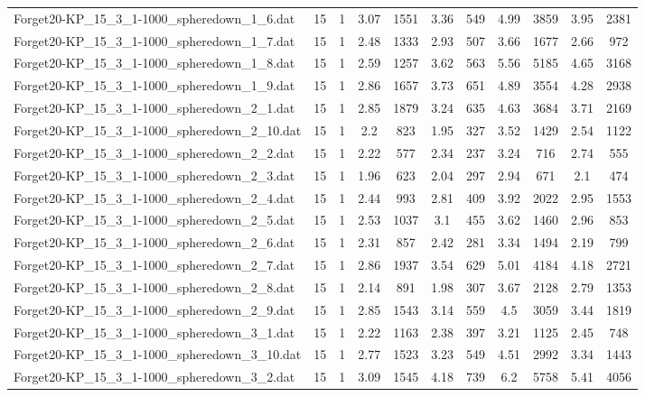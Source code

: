 \begin{table}[!ht]
\begin{tabular}{lcccccccccc}
Forget20-KP\_15\_3\_1-1000\_spheredown\_1\_6.dat & 15 & 1 & 3.07 & 1551 & 3.36 & 549 & 4.99 & 3859 & 3.95 & 2381 \\
Forget20-KP\_15\_3\_1-1000\_spheredown\_1\_7.dat & 15 & 1 & 2.48 & 1333 & 2.93 & 507 & 3.66 & 1677 & 2.66 & 972 \\
Forget20-KP\_15\_3\_1-1000\_spheredown\_1\_8.dat & 15 & 1 & 2.59 & 1257 & 3.62 & 563 & 5.56 & 5185 & 4.65 & 3168 \\
Forget20-KP\_15\_3\_1-1000\_spheredown\_1\_9.dat & 15 & 1 & 2.86 & 1657 & 3.73 & 651 & 4.89 & 3554 & 4.28 & 2938 \\
Forget20-KP\_15\_3\_1-1000\_spheredown\_2\_1.dat & 15 & 1 & 2.85 & 1879 & 3.24 & 635 & 4.63 & 3684 & 3.71 & 2169 \\
Forget20-KP\_15\_3\_1-1000\_spheredown\_2\_10.dat & 15 & 1 & 2.2 & 823 & 1.95 & 327 & 3.52 & 1429 & 2.54 & 1122 \\
Forget20-KP\_15\_3\_1-1000\_spheredown\_2\_2.dat & 15 & 1 & 2.22 & 577 & 2.34 & 237 & 3.24 & 716 & 2.74 & 555 \\
Forget20-KP\_15\_3\_1-1000\_spheredown\_2\_3.dat & 15 & 1 & 1.96 & 623 & 2.04 & 297 & 2.94 & 671 & 2.1 & 474 \\
Forget20-KP\_15\_3\_1-1000\_spheredown\_2\_4.dat & 15 & 1 & 2.44 & 993 & 2.81 & 409 & 3.92 & 2022 & 2.95 & 1553 \\
Forget20-KP\_15\_3\_1-1000\_spheredown\_2\_5.dat & 15 & 1 & 2.53 & 1037 & 3.1 & 455 & 3.62 & 1460 & 2.96 & 853 \\
Forget20-KP\_15\_3\_1-1000\_spheredown\_2\_6.dat & 15 & 1 & 2.31 & 857 & 2.42 & 281 & 3.34 & 1494 & 2.19 & 799 \\
Forget20-KP\_15\_3\_1-1000\_spheredown\_2\_7.dat & 15 & 1 & 2.86 & 1937 & 3.54 & 629 & 5.01 & 4184 & 4.18 & 2721 \\
Forget20-KP\_15\_3\_1-1000\_spheredown\_2\_8.dat & 15 & 1 & 2.14 & 891 & 1.98 & 307 & 3.67 & 2128 & 2.79 & 1353 \\
Forget20-KP\_15\_3\_1-1000\_spheredown\_2\_9.dat & 15 & 1 & 2.85 & 1543 & 3.14 & 559 & 4.5 & 3059 & 3.44 & 1819 \\
Forget20-KP\_15\_3\_1-1000\_spheredown\_3\_1.dat & 15 & 1 & 2.22 & 1163 & 2.38 & 397 & 3.21 & 1125 & 2.45 & 748 \\
Forget20-KP\_15\_3\_1-1000\_spheredown\_3\_10.dat & 15 & 1 & 2.77 & 1523 & 3.23 & 549 & 4.51 & 2992 & 3.34 & 1443 \\
Forget20-KP\_15\_3\_1-1000\_spheredown\_3\_2.dat & 15 & 1 & 3.09 & 1545 & 4.18 & 739 & 6.2 & 5758 & 5.41 & 4056 \\

\end{tabular}
\end{table}
